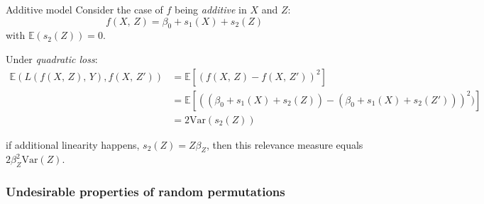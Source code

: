 \begin{example}{Additive model}{}
    Consider the case of $f$ being \emph{additive} in $X$ and $Z$:
    \begin{equation*}
        f(X,\,Z) = \beta_0 + s_1(X) + s_2(Z)
    \end{equation*}
    with $\mathds{E}(s_2(Z)) = 0$.

    Under \emph{quadratic loss}:
    \begin{align*}
        \mathds{E}(L(f(X,\,Z),\,Y),f(X,\,Z')) &= \mathds{E} \left[ (f(X,\,Z) - f(X,\,Z'))^2 \right] \\
            &= \mathds{E} \left[ 
                \left(
                    (\beta_0 + s_1(X) + s_2(Z)) - (\beta_0 + s_1(X) + s_2(Z'))
                    \right)^2
                    )
            \right] \\
            &= 2\text{Var}(s_2(Z))
    \end{align*}

    if additional linearity happens, $s_2(Z) = Z\beta_Z$, then this relevance measure
    equals $2\beta_Z^2 \text{Var}(Z)$.
\end{example}

\subsubsection{Undesirable properties of random permutations}

